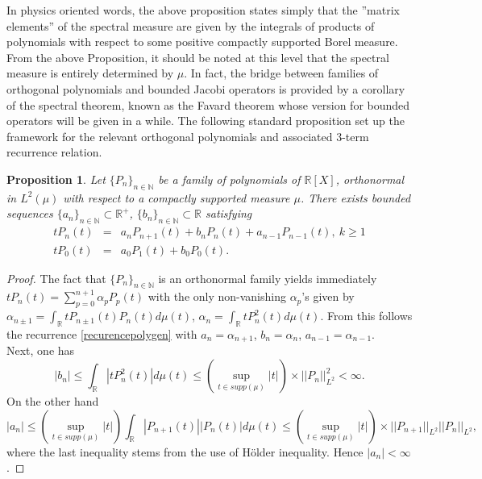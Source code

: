 \documentclass[a4paper]{jpconf}
\numberwithin{equation}{section}
\newtheorem{proposition}[Theorem]{Proposition}
\theoremstyle{nonumberplain}
\newtheorem{proof}{Proof}
\begin{document}
In physics oriented words, the above proposition states simply that the ''matrix elements'' of the spectral measure are given by the integrals of products of polynomials with respect to some positive compactly supported Borel measure. \\
From the above Proposition, it should be noted at this level that the spectral measure is entirely determined by $\mu$. In fact, the bridge between families of orthogonal polynomials and bounded Jacobi operators is provided by a corollary of the spectral theorem, known as the Favard theorem whose version for bounded operators will be given in a while. The following standard proposition set up the framework for the relevant orthogonal polynomials and associated 3-term recurrence relation.
\begin{proposition}\label{recur-poly}
Let $\{P_n\}_{n\in\mathbb{N}}$ be a family of polynomials of $\mathbb{R}[X]$, orthonormal in $L^2(\mu)$ with respect to a compactly supported measure $\mu$. There exists bounded sequences $\{a_n\}_{n\in\mathbb{N}}\subset\mathbb{R}^+$, $\{b_n\}_{n\in\mathbb{N}}\subset\mathbb{R}$ satisfying
\begin{eqnarray}
tP_n(t)&=&a_nP_{n+1}(t)+b_nP_n(t)+a_{n-1}P_{n-1}(t),\ k\ge1\nonumber\\
tP_0(t)&=&a_0P_1(t)+b_0P_0(t)\label{recurencepolygen}.
\end{eqnarray}
\end{proposition}
\begin{proof}
The fact that $\{P_n\}_{n\in\mathbb{N}}$ is an orthonormal family yields immediately $tP_n(t)=\sum_{p=0}^{n+1}\alpha_pP_p(t)$ with the only non-vanishing $\alpha_p$'s given by $\alpha_{n\pm1}=\int_\mathbb{R}tP_{n\pm1}(t)P_{n}(t)d\mu(t)$, $\alpha_n=\int_{\mathbb{R}}tP_n^2(t)d\mu(t)$. From this follows the recurrence \eqref{recurencepolygen} with $a_n=\alpha_{n+1}$, $b_n=\alpha_n$, $a_{n-1}=\alpha_{n-1}$. \\
Next, one has 
\begin{equation}
|b_n|\le\int_\mathbb{R}|tP_n^2(t)|d\mu(t)\le(\sup_{t\in supp(\mu)}|t|)\times||P_n||^2_{L^2}<\infty. 
\end{equation}
On the other hand 
\begin{equation}
|a_n|\le(\sup_{t\in supp(\mu)}|t|)\int_\mathbb{R}|P_{n+1}(t)||P_n(t)|d\mu(t)\le(\sup_{t\in supp(\mu)}|t|)\times||P_{n+1}||_{L^2} ||P_n||_{L^2},
\end{equation}
where the last inequality stems from the use of H\"older inequality. Hence $|a_n|<\infty$.
\end{proof}
\end{document}

